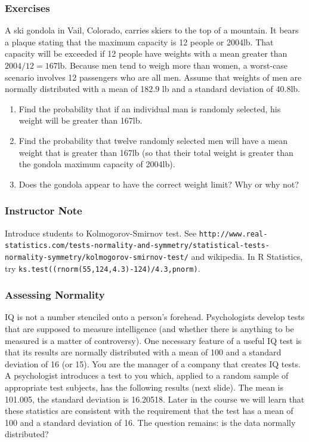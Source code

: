 \documentclass[xcolor=dvipsnames]{beamer}
\begin{document}
\begin{frame}
  \frametitle{Exercises} 
  {\ubung} A ski gondola in Vail, Colorado, carries skiers to the top
  of a mountain. It bears a plaque stating that the maximum capacity
  is 12 people or 2004lb. That capacity will be exceeded if 12 people
  have weights with a mean greater than $2004/12=167$lb. Because men
  tend to weigh more than women, a worst-case scenario involves 12
  passengers who are all men. Assume that weights of men are normally
  distributed with a mean of 182.9 lb and a standard deviation of
  40.8lb.
  \begin{enumerate}
  \item Find the probability that if an individual man is randomly
    selected, his weight will be greater than 167lb.
  \item Find the probability that twelve randomly selected men
    will have a mean weight that is greater than 167lb (so that their
    total weight is greater than the gondola maximum capacity of
    2004lb).
  \item Does the gondola appear to have the correct weight limit?
    Why or why not?
  \end{enumerate}
\end{frame}

\begin{frame}
  \frametitle{Instructor Note}
  Introduce students to Kolmogorov-Smirnov test. See
  \texttt{http://www.real-statistics.com/tests-normality-and-symmetry/statistical-tests-normality-symmetry/kolmogorov-smirnov-test/}
  and wikipedia. In R Statistics, try \texttt{ks.test((rnorm(55,124,4.3)-124)/4.3,pnorm)}.
\end{frame}

\begin{frame}
  \frametitle{Assessing Normality}
  IQ is not a number stenciled onto a person's forehead. Psychologists
  develop tests that are supposed to measure intelligence (and whether
  there is anything to be measured is a matter of controversy). One
  necessary feature of a useful IQ test is that its results are
  normally distributed with a mean of 100 and a standard deviation of
  16 (or 15). You are the manager of a company that creates IQ tests.
  A psychologist introduces a test to you which, applied to a random
  sample of appropriate test subjects, has the following results (next
  slide). The mean is 101.005, the standard deviation is 16.20518.
  Later in the course we will learn that these statistics are
  consistent with the requirement that the test has a mean of 100
  and a standard deviation of 16. The question remains: is the
  data normally distributed?
\end{frame}
\end{document}
